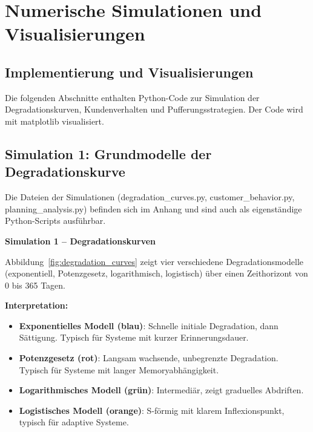 \documentclass[a4paper, 12pt, twoside, openright]{report}
\theoremstyle{definition}
\theoremstyle{definition}
\begin{document}
\section{Numerische Simulationen und Visualisierungen}
\label{sec:simul}

\subsection{Implementierung und Visualisierungen}

Die folgenden Abschnitte enthalten Python-Code zur Simulation der Degradationskurven, Kundenverhalten und Pufferungsstrategien. Der Code wird mit matplotlib visualisiert.

\subsection{Simulation 1: Grundmodelle der Degradationskurve}

Die Dateien der Simulationen (degradation\_curves.py, customer\_behavior.py, planning\_analysis.py) befinden sich im Anhang und sind auch als eigenständige Python-Scripts ausführbar.

\textbf{Simulation 1 – Degradationskurven}

Abbildung~\ref{fig:degradation_curves} zeigt vier verschiedene Degradationsmodelle (exponentiell, Potenzgesetz, logarithmisch, logistisch) über einen Zeithorizont von 0 bis 365 Tagen.

\textbf{Interpretation:}
\begin{itemize}
  \item \textbf{Exponentielles Modell (blau)}: Schnelle initiale Degradation, dann Sättigung. Typisch für Systeme mit kurzer Erinnerungsdauer.
  
  \item \textbf{Potenzgesetz (rot)}: Langsam wachsende, unbegrenzte Degradation. Typisch für Systeme mit langer Memoryabhängigkeit.
  
  \item \textbf{Logarithmisches Modell (grün)}: Intermediär, zeigt graduelles Abdriften.
  
  \item \textbf{Logistisches Modell (orange)}: S-förmig mit klarem Inflexionspunkt, typisch für adaptive Systeme.
\end{itemize}
\end{document}
